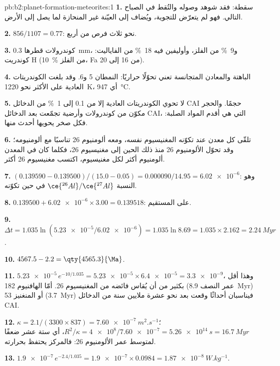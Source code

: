 \begin{solution}{pb:b2:planet-formation-meteorites:1}
\textbf{1.} سقطة: فقد شوهد وصوله والتُقط في الصباح التالي.
فهو لم يتعرّض للتجوية، ويُضاف إلى العيّنة غير المنحازة لما يصل إلى الأرض.

\textbf{2.} $856/1107 = 0.77$: نحو ثلاث فرص من أربع.

\textbf{3.} كوندرولات قطرها \qty{0.3}{mm}، و\qty{9}{\percent} من الفلز، وأوليفين فيه
\qty{18}{\percent} من الفاياليت: كوندريت H (\qty{10}{\percent} من الفلز، Fa من 16 إلى 20).

\textbf{4.}  الباهتة والمعادن المتجانسة تعني تحوّلًا حراريًا: النمطان
5 و6. وقد بلغت الكوندريتات العادية على الأكثر نحو \qty{1220}{K}، أي
\qty{947}{\degreeCelsius}.

\textbf{5.} لا تحوي الكوندريتات العادية إلا من 0.1 إلى \qty{1}{\percent} من الدخائل CAI
حجمًا. والحجر مكوّن من كوندرولات وأرضية تجمّعت بعد الدخائل CAI، التي
هي أقدم المواد الصلبة: فكل صخر يحويها أحدث منها.

\textbf{6.} تلقّى كل معدن عند تكوّنه المغنيسيوم نفسه، ومعه ألومنيوم 26
تناسبًا مع ألومنيومه؛ وقد تحوّل الألومنيوم 26 منذ ذلك الحين إلى
مغنيسيوم 26، فكلما كان في المعدن ألومنيوم أكثر لكل مغنيسيوم، اكتسب
مغنيسيوم 26 أكثر.

\textbf{7.} $(0.139590 - 0.139500)/(15.0 - 0.05) = \num{0.000090}/14.95 =
\num{6.02e-6}$: وهو النسبة $\ce{^{26}Al}/\ce{^{27}Al}$ في  حين
تكوّنه.

\textbf{8.} $0.139500 + \num{6.02e-6}\times3.00 = 0.139518$: على المستقيم.

\textbf{9.} $\Delta t = 1.035\ln(\num{5.23e-5}/\num{6.02e-6}) = 1.035\ln8.69 =
1.035\times2.162 = \qty{2.24}{Myr}$.

\textbf{10.} $4567.5 - 2.2 = \qty{4565.3}{\Ma}$.

\textbf{11.} $\num{5.23e-5}\,e^{-10/1.035} = \num{5.23e-5}\times\num{6.4e-5} =
\num{3.3e-9}$، وهذا أقل بكثير من أن يُقاس فائضه من المغنيسيوم 26. أمّا الهافنيوم 182 (عمر النصف
\qty{8.9}{Myr}) أو المنغنيز 53 (\qty{3.7}{Myr}) فيناسبان أحداثًا وقعت بعد نحو عشرة ملايين سنة
من الدخائل CAI.

\textbf{12.} $\kappa = 2.1/(3300\times837) = \qty{7.60e-7}{m^2.s^{-1}}$؛
$R^2/\kappa = \num{4e8}/\num{7.60e-7} = \qty{5.26e14}{s} = \qty{16.7}{Myr}$، أي ستة عشر
ضعفًا لمتوسط عمر الألومنيوم 26: فالمركز يحتفظ بحرارته.

\textbf{13.} $\num{1.9e-7}\,e^{-2.4/1.035} = \num{1.9e-7}\times0.0984 =
\qty{1.87e-8}{W.kg^{-1}}$.


\end{solution}
